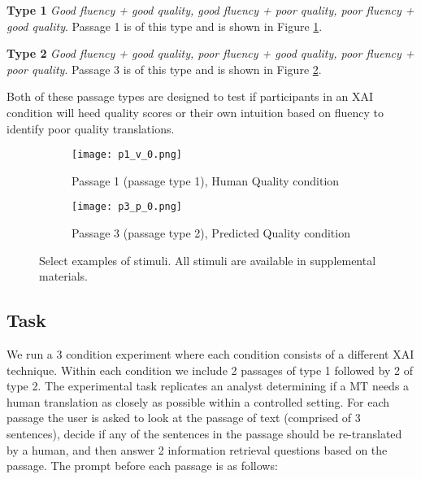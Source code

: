 \begin{compacthang}
    \item \textbf{Type 1} \textit{Good fluency + good quality, good fluency + poor quality, poor fluency + good quality}. Passage 1 is of this type and is shown in Figure \ref{fig:p1_human_quality}.    

    \item \textbf{Type 2} \textit{Good fluency + good quality, poor fluency + good quality, poor fluency + poor quality}. Passage 3 is of this type and is shown in Figure \ref{fig:p3_predicted_quality}.     
\end{compacthang}

Both of these passage types are designed to test if participants in an XAI condition will heed quality scores or their own intuition based on fluency to identify poor quality translations. 

\begin{figure}
    \centering
    
    \begin{subfigure}[t]{0.45\textwidth}
        \centering
        \texttt{[image: p1\_v\_0.png]} 
        \caption{Passage 1 (passage type 1), Human Quality condition} \label{fig:p1_human_quality}
    \end{subfigure}
    \hfill
     \begin{subfigure}[t]{0.45\textwidth}
        \centering
        \texttt{[image: p3\_p\_0.png]} 
        \caption{Passage 3 (passage type 2), Predicted Quality condition} \label{fig:p3_predicted_quality}
    \end{subfigure}
    
    \caption{Select examples of stimuli. All stimuli are available in supplemental materials.}
    \label{fig:exp_stim}
    
\end{figure}

\subsection{Task} 
We run a 3 condition experiment where each condition consists of a different XAI technique. Within each condition we include 2 passages of type 1 followed by 2 of type 2. The experimental task replicates an analyst determining if a MT needs a human translation as closely as possible within a controlled setting. For each passage the user is asked to look at the passage of text (comprised of 3 sentences), decide if any of the sentences in the passage should be re-translated by a human, and then answer 2 information retrieval questions based on the passage. The prompt before each passage is as follows:

